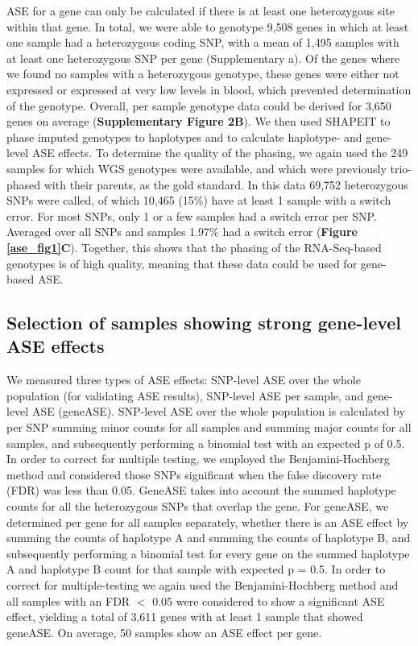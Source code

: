 ASE for a gene can only be calculated if there is at least one heterozygous site within that gene. In total, we were able to genotype 9,508 genes in which at least one sample had a heterozygous coding SNP, with a mean of 1,495 samples with at least one heterozygous SNP per gene (Supplementary a). Of the genes where we found no samples with a heterozygous genotype, these genes were either not expressed or expressed at very low levels in blood, which prevented determination of the genotype. Overall, per sample genotype data could be derived for 3,650 genes on average (\textbf{Supplementary Figure 2B}). We then used SHAPEIT\cite{oconnellGeneralApproachHaplotype2014} to phase imputed genotypes to haplotypes and to calculate haplotype- and gene-level ASE effects. To determine the quality of the phasing, we again used the 249 samples for which WGS genotypes were available, and which were previously trio-phased with their parents, as the gold standard. In this data 69,752 heterozygous SNPs were called, of which 10,465 (15\%) have at least 1 sample with a switch error. For most SNPs, only 1 or a few samples had a switch error per SNP. Averaged over all SNPs and samples 1.97\% had a switch error (\textbf{Figure \ref{ase_fig1}C}). Together, this shows that the phasing of the RNA-Seq-based genotypes is of high quality, meaning that these data could be used for gene-based ASE.

\subsection{Selection of samples showing strong gene-level ASE effects}
We measured three types of ASE effects: SNP-level ASE over the whole population (for validating ASE results), SNP-level ASE per sample, and gene-level ASE (geneASE). SNP-level ASE over the whole population is calculated by per SNP summing minor counts for all samples and summing major counts for all samples, and subsequently performing a binomial test with an expected p of 0.5. In order to correct for multiple testing, we employed the Benjamini-Hochberg method and considered those SNPs significant when the false discovery rate (FDR) was less than 0.05. GeneASE takes into account the summed haplotype counts for all the heterozygous SNPs that overlap the gene. For geneASE, we determined per gene for all samples separately, whether there is an ASE effect by summing the counts of haplotype A and summing the counts of haplotype B, and subsequently performing a binomial test for every gene on the summed haplotype A and haplotype B count for that sample with expected p = 0.5. In order to correct for multiple-testing we again used the Benjamini-Hochberg method and all samples with an FDR $<$ 0.05 were considered to show a significant ASE effect, yielding a total of 3,611 genes with at least 1 sample that showed geneASE. On average, 50 samples show an ASE effect per gene.

